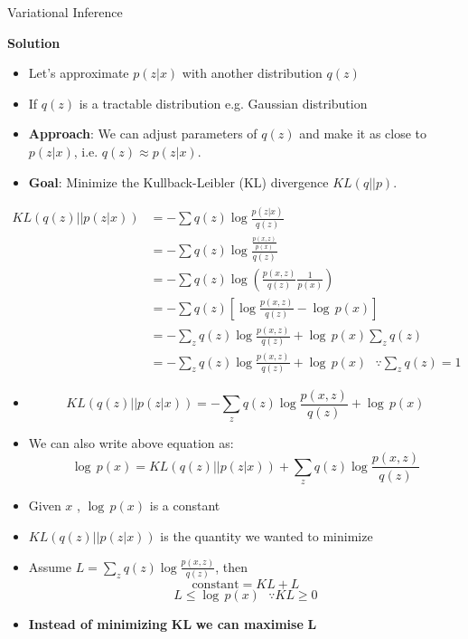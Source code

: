 \begin{frame}[allowframebreaks]{Variational Inference}

    \textbf{\large Solution}
    \begin{itemize}
        \item Let's approximate $p(z|x)$ with another distribution $q(z)$
        \item If $q(z)$ is a tractable distribution e.g. Gaussian distribution
        \item \textbf{Approach}: We can adjust parameters of $q(z)$ and make it as close to $p(z|x)$, i.e. $q(z) \approx p(z|x)$.
        \item \textbf{Goal}: Minimize the Kullback-Leibler (KL) divergence $KL(q||p)$.
    \end{itemize}

\framebreak
\begin{equation*}
    \begin{split}
        KL(q(z)||p(z|x)) & = - \sum q(z) \log \frac{ p(z|x)}{q(z)}\\
        & = - \sum q(z) \log \frac{\frac{p(x,z)}{p(x)}}{q(z)}\\
        & = - \sum q(z) \log \left ( \frac{p(x,z)}{q(z)}\frac{1}{p(x)} \right )\\
        & = - \sum q(z) \left [\log \frac{p(x,z)}{q(z)} - \log \, p(x) \right ]\\
        & = - \sum_z q(z) \log \frac{p(x,z)}{q(z)} + \log \, p(x) \sum_z q(z)\\
        & = - \sum_z q(z) \log \frac{p(x,z)}{q(z)} + \log \, p(x) \,\,\,\, \because \sum_z q(z) = 1
    \end{split}
\end{equation*}

\framebreak

\begin{itemize}
    \item $$KL(q(z)||p(z|x)) = - \sum_z q(z) \log \frac{p(x,z)}{q(z)} + \log \, p(x) $$
    \item We can also write above equation as:
    $$\log \, p(x) = KL(q(z)||p(z|x)) + \sum_z q(z) \log \frac{p(x,z)}{q(z)}$$
\end{itemize}

\framebreak


\begin{itemize}
        \item Given $x$ , $\log \, p(x)$ is a constant
        \item $KL(q(z)||p(z|x))$ is the quantity we wanted to minimize
        \item Assume $L = \sum_z q(z) \log \frac{p(x,z)}{q(z)}$, then
        $$\text{constant} = KL + L$$
        $$L \leq \log \, p(x) \,\,\,\, \because KL \geq 0$$

    \item \textbf{Instead of minimizing} $\mathbf{KL}$ \textbf{we can maximise} $\mathbf{L}$
\end{itemize}
\end{frame}
